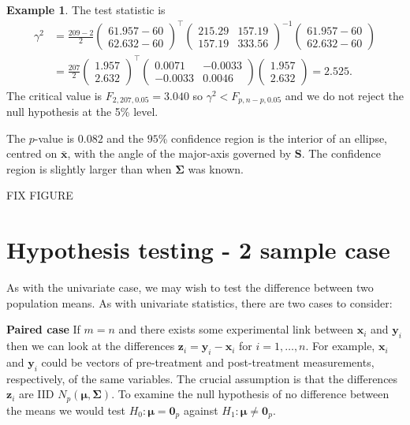 \documentclass[]{book}
\theoremstyle{definition}
\theoremstyle{definition}
\newtheorem{example}{Example}[chapter]
\theoremstyle{definition}
\theoremstyle{remark}
\begin{document}
\begin{example}
The test statistic is
\begin{align*}
\gamma^2 &= \frac{209-2}{2} \begin{pmatrix} 61.957 - 60 \\ 62.632 - 60 \end{pmatrix}^\top \begin{pmatrix} 215.29 & 157.19 \\ 157.19 & 333.56 \end{pmatrix}^{-1} \begin{pmatrix} 61.957 - 60 \\ 62.632 - 60 \end{pmatrix} \\
&= \frac{207}{2} \begin{pmatrix} 1.957 \\ 2.632 \end{pmatrix}^\top \begin{pmatrix} 0.0071 & -0.0033 \\ -0.0033 & 0.0046 \end{pmatrix} \begin{pmatrix} 1.957 \\ 2.632 \end{pmatrix} = 2.525.
\end{align*}
The critical value is \(F_{2,207,0.05} = 3.040\) so \(\gamma^2 < F_{p,n-p,0.05}\) and we do not reject the null hypothesis at the 5\% level.

The \(p\)-value is \(0.082\) and the \(95\)\% confidence region is the interior of an ellipse, centred on \(\bar{\boldsymbol x}\), with the angle of the major-axis governed by \(\boldsymbol S\). The confidence region is slightly larger than when \(\boldsymbol \Sigma\) was known.

FIX FIGURE
\end{example}

\hypertarget{hypothesis-testing---2-sample-case}{%
\section{Hypothesis testing - 2 sample case}\label{hypothesis-testing---2-sample-case}}

As with the univariate case, we may wish to test the difference between two population means. As with univariate statistics, there are two cases to consider:

\textbf{Paired case} If \(m=n\) and there exists some experimental link between \(\boldsymbol x_i\) and \(\boldsymbol y_i\) then we can look at the differences \(\boldsymbol z_i = \boldsymbol y_i - \boldsymbol x_i\) for \(i=1,\ldots,n\). For example, \(\boldsymbol x_i\) and \(\boldsymbol y_i\) could be vectors of pre-treatment and post-treatment measurements, respectively, of the same variables. The crucial assumption is that the differences \(\boldsymbol z_i\) are IID \(N_p(\boldsymbol \mu, \boldsymbol \Sigma)\). To examine the null hypothesis of no difference between the means we would test \(H_0: \boldsymbol \mu={\mathbf 0}_p\) against \(H_1: \boldsymbol \mu\neq {\mathbf 0}_p\).
\end{document}
